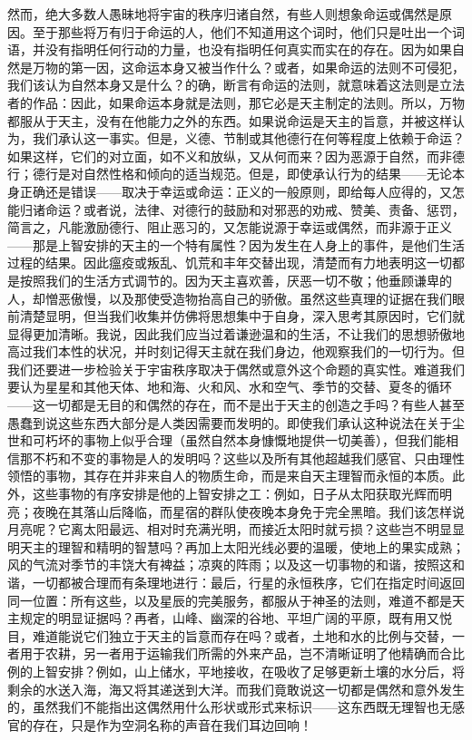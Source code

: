 然而，绝大多数人愚昧地将宇宙的秩序归诸自然，有些人则想象命运或偶然是原因。至于那些将万有归于命运的人，他们不知道用这个词时，他们只是吐出一个词语，并没有指明任何行动的力量，也没有指明任何真实而实在的存在。因为如果自然是万物的第一因，这命运本身又被当作什么？或者，如果命运的法则不可侵犯，我们该认为自然本身又是什么？的确，断言有命运的法则，就意味着这法则是立法者的作品：因此，如果命运本身就是法则，那它必是天主制定的法则。所以，万物都服从于天主，没有在他能力之外的东西。如果说命运是天主的旨意，并被这样认为，我们承认这一事实。但是，义德、节制或其他德行在何等程度上依赖于命运？如果这样，它们的对立面，如不义和放纵，又从何而来？因为恶源于自然，而非德行；德行是对自然性格和倾向的适当规范。但是，即使承认行为的结果——无论本身正确还是错误——取决于幸运或命运：正义的一般原则，即给每人应得的，又怎能归诸命运？或者说，法律、对德行的鼓励和对邪恶的劝戒、赞美、责备、惩罚，简言之，凡能激励德行、阻止恶习的，又怎能说源于幸运或偶然，而非源于正义——那是上智安排的天主的一个特有属性？因为发生在人身上的事件，是他们生活过程的结果。因此瘟疫或叛乱、饥荒和丰年交替出现，清楚而有力地表明这一切都是按照我们的生活方式调节的。因为天主喜欢善，厌恶一切不敬；他垂顾谦卑的人，却憎恶傲慢，以及那使受造物抬高自己的骄傲。虽然这些真理的证据在我们眼前清楚显明，但当我们收集并仿佛将思想集中于自身，深入思考其原因时，它们就显得更加清晰。我说，因此我们应当过着谦逊温和的生活，不让我们的思想骄傲地高过我们本性的状况，并时刻记得天主就在我们身边，他观察我们的一切行为。但我们还要进一步检验关于宇宙秩序取决于偶然或意外这个命题的真实性。难道我们要认为星星和其他天体、地和海、火和风、水和空气、季节的交替、夏冬的循环——这一切都是无目的和偶然的存在，而不是出于天主的创造之手吗？有些人甚至愚蠢到说这些东西大部分是人类因需要而发明的。即使我们承认这种说法在关于尘世和可朽坏的事物上似乎合理（虽然自然本身慷慨地提供一切美善），但我们能相信那不朽和不变的事物是人的发明吗？这些以及所有其他超越我们感官、只由理性领悟的事物，其存在并非来自人的物质生命，而是来自天主理智而永恒的本质。此外，这些事物的有序安排是他的上智安排之工：例如，日子从太阳获取光辉而明亮；夜晚在其落山后降临，而星宿的群队使夜晚本身免于完全黑暗。我们该怎样说月亮呢？它离太阳最远、相对时充满光明，而接近太阳时就亏损？这些岂不明显显明天主的理智和精明的智慧吗？再加上太阳光线必要的温暖，使地上的果实成熟；风的气流对季节的丰饶大有裨益；凉爽的阵雨；以及这一切事物的和谐，按照这和谐，一切都被合理而有条理地进行：最后，行星的永恒秩序，它们在指定时间返回同一位置：所有这些，以及星辰的完美服务，都服从于神圣的法则，难道不都是天主规定的明显证据吗？再者，山峰、幽深的谷地、平坦广阔的平原，既有用又悦目，难道能说它们独立于天主的旨意而存在吗？或者，土地和水的比例与交替，一者用于农耕，另一者用于运输我们所需的外来产品，岂不清晰证明了他精确而合比例的上智安排？例如，山上储水，平地接收，在吸收了足够更新土壤的水分后，将剩余的水送入海，海又将其递送到大洋。而我们竟敢说这一切都是偶然和意外发生的，虽然我们不能指出这偶然用什么形状或形式来标识——这东西既无理智也无感官的存在，只是作为空洞名称的声音在我们耳边回响！\par

